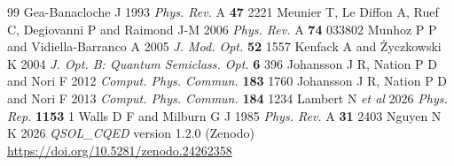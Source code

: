 \documentclass{iopjournal}
\begin{document}
\begin{thebibliography}{99}
 Gea-Banacloche J 1993 {\it Phys. Rev.} A {\bf 47} 2221
 Meunier T, Le Diffon A, Ruef C, Degiovanni P and Raimond J-M 2006 {\it Phys. Rev.} A {\bf 74} 033802
 Munhoz P P and Vidiella-Barranco A 2005 {\it J. Mod. Opt.} {\bf 52} 1557
 Kenfack A and \.{Z}yczkowski K 2004 {\it J. Opt. B: Quantum Semiclass. Opt.} {\bf 6} 396
 Johansson J R, Nation P D and Nori F 2012 {\it Comput. Phys. Commun.} {\bf 183} 1760
 Johansson J R, Nation P D and Nori F 2013 {\it Comput. Phys. Commun.} {\bf 184} 1234
 Lambert N {\it et al} 2026 {\it Phys. Rep.} {\bf 1153} 1
 Walls D F and Milburn G J 1985 {\it Phys. Rev.} A {\bf 31} 2403
 Nguyen N K 2026 {\it QSOL\_CQED} version 1.2.0 (Zenodo) \url{https://doi.org/10.5281/zenodo.24262358}
\end{thebibliography}
\end{document}
